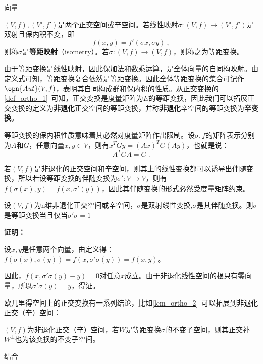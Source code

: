 
\begin{issues}
\issueDraft 向量
\end{issues}


\begin{definition}{}
$(V,f),(V',f')$是两个正交空间或辛空间。若线性映射$\sigma:(V,f)\rightarrow (V',f')$是双射且保内积不变，即\begin{equation}
f(x,y)=f'(\sigma x,\sigma y)~,
\end{equation}
则称$\sigma $是\textbf{等距映射}（isometry）。若$\sigma:(V,f)\rightarrow (V,f)$，则称之为等距变换。
\end{definition}
由于等距变换是线性映射，因此保加法和数乘运算，是全体向量的自同构映射。由定义式可知，等距变换复合依然是等距变换。因此全体等距变换的集合可记作$\opn{Aut}(V,f)$，表明其自同构成群和保内积的性质。从正交变换的\autoref{def_ortho_1}~可知，正交变换是度量矩阵为$E$的等距变换，因此我们可以拓展正交变换的定义为\textbf{非退化}正交空间的等距变换，并称\textbf{非退化}辛空间的等距变换为\textbf{辛变换}。

等距变换的保内积性质意味着其必然对度量矩阵作出限制。设$\sigma,f$的矩阵表示分别为$A$和$G$，任意向量$x,y\in V$，则有$x^{T}Gy=(Ax)^TG(Ay)$，也就是说：
\begin{equation}
A^TGA=G~.
\end{equation}

若$(V,f)$是非退化的正交空间和辛空间，则其上的线性变换都可以诱导出伴随变换，所以若设等距变换的伴随变换为$\sigma':V\rightarrow V$，则有$f(\sigma(x),y)=f(x,\sigma'(y))$，因此其伴随变换的形式必然受度量矩阵约束。
\begin{theorem}{}
设$(V,f)$为n维非退化正交空间或辛空间，$\sigma$是双射线性变换,$\sigma$是其伴随变换。则$\sigma$是等距变换当且仅当$\sigma'\sigma=1$
\end{theorem}
\textbf{证明：}

设$x,y$是任意两个向量，由定义得：$f(\sigma(x),\sigma(y))=f(x,\sigma'\sigma(y))=f(x,y)$。

因此，$f(x,\sigma'\sigma(y)-y)=0$对任意$x$成立。由于非退化线性空间的根只有零向量，所以$\sigma'\sigma(y)=y$，得证。

欧几里得空间上的正交变换有一系列结论，比如\autoref{lem_ortho_2}~可以拓展到非退化正交（辛）空间：
\begin{theorem}{}
$(V,f)$为非退化正交（辛）空间，若$W$是等距变换$\sigma$的不变子空间，则其正交补$W^{\bot}$也为该变换的不变子空间。
\end{theorem}

结合